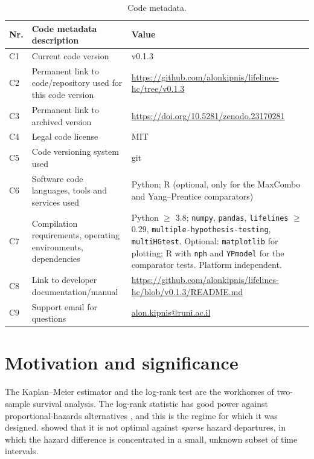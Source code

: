 \documentclass[11pt]{article}
\begin{document}
\begin{table}[H]
\centering
\small
\begin{tabular}{@{}lL{4.2cm}L{7.4cm}@{}}
\toprule
\textbf{Nr.} & \textbf{Code metadata description} & \textbf{Value} \\
\midrule
C1 & Current code version & v0.1.3 \\[2pt]
C2 & Permanent link to code/repository used for this code version &
     \url{https://github.com/alonkipnis/lifelines-hc/tree/v0.1.3} \\[2pt]
C3 & Permanent link to archived version &
     \url{https://doi.org/10.5281/zenodo.23170281} \\[2pt]
C4 & Legal code license & MIT \\[2pt]
C5 & Code versioning system used & git \\[2pt]
C6 & Software code languages, tools and services used &
     Python; R (optional, only for the MaxCombo and Yang--Prentice
     comparators) \\[2pt]
C7 & Compilation requirements, operating environments, dependencies &
     Python $\geq$ 3.8; \texttt{numpy}, \texttt{pandas},
     \texttt{lifelines} $\geq$ 0.29, \texttt{multiple-hypothesis-testing},
     \texttt{multiHGtest}. Optional: \texttt{matplotlib} for plotting;
     R with \texttt{nph} and \texttt{YPmodel} for the comparator tests.
     Platform independent. \\[2pt]
C8 & Link to developer documentation/manual &
     \url{https://github.com/alonkipnis/lifelines-hc/blob/v0.1.3/README.md} \\[2pt]
C9 & Support email for questions &
     \href{mailto:alon.kipnis@runi.ac.il}{alon.kipnis@runi.ac.il} \\
\bottomrule
\end{tabular}
\caption{Code metadata.}
\label{tab:codemeta}
\end{table}

\section{Motivation and significance}

The Kaplan--Meier estimator \citep{kaplan1958} and the log-rank test
\citep{mantel1966} are the workhorses of two-sample survival analysis.
The log-rank statistic has good power against proportional-hazards
alternatives \citep{schoenfeld1981}, and this is the regime for which it
was designed. \citet{kipnis_biometrika} showed that it is not optimal
against \emph{sparse} hazard departures, in which the hazard difference is
concentrated in a small, unknown subset of time intervals.
\end{document}

